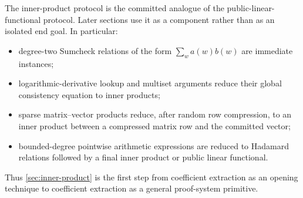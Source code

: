 \begin{remark}
\label{rem:ip-later-applications}
The inner-product protocol is the committed analogue of the public-linear-functional protocol.  Later sections use it as a component rather than as an isolated end goal.  In particular:
\begin{itemize}[leftmargin=*]
  \item degree-two Sumcheck relations of the form $\sum_w a(w)b(w)$ are immediate instances;
  \item logarithmic-derivative lookup and multiset arguments reduce their global consistency equation to inner products;
  \item sparse matrix--vector products reduce, after random row compression, to an inner product between a compressed matrix row and the committed vector;
  \item bounded-degree pointwise arithmetic expressions are reduced to Hadamard relations followed by a final inner product or public linear functional.
\end{itemize}
Thus \cref{sec:inner-product} is the first step from coefficient extraction as an opening technique to coefficient extraction as a general proof-system primitive.
\end{remark}

